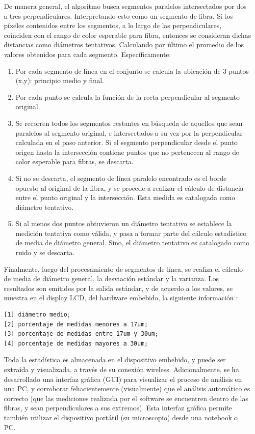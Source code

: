 \documentclass[runningheads,a4paper]{llncs}
\begin{document}
 
De manera general, el algoritmo busca segmentos paralelos intersectados por dos a tres perpendiculares.
Interpretando esto como un segmento de fibra. Si los píxeles contenidos entre los segmentos, a lo largo de
 las  perpendiculares, coinciden con el rango de color esperable para fibra, entonces se consideran dichas
distancias como diámetros tentativos. Calculando por último el promedio de los valores obtenidos para 
cada segmento. Específicamente:   


\begin{enumerate}
\item Por cada segmento de línea en el conjunto se calcula la ubicación de 3 puntos (x,y):
principio medio y final. 
\item Por cada punto se calcula la función de la recta perpendicular al segmento original.
\item Se recorren todos los segmentos restantes en búsqueda de aquellos que sean paralelos al segmento original, e intersectados a su vez por la perpendicular calculada en el paso anterior.
Si el segmento perpendicular desde el punto origen hasta la intersección contiene puntos que no pertenecen al rango de color esperable para fibras, se descarta.
\item Si no se descarta,  el segmento de línea paralelo encontrado es el borde opuesto al original de la fibra, y se procede a realizar el cálculo de distancia entre el punto original y la intersección. Esta medida es catalogada como diámetro tentativo.
\item Si al menos dos puntos obtuvieron un diámetro tentativo se establece la medición tentativa como válida, y pasa a formar parte del cálculo estadístico de media de diámetro general. Sino, el diámetro tentativo es catalogado como ruido y se descarta.
\end{enumerate}

	Finalmente, luego del procesamiento de segmentos de línea, se realiza el cálculo de media de diámetro general, la desviación estándar y la varianza.
	Los resultados son emitidos por la salida estándar, y de acuerdo a los valores, se muestra en el display LCD, del hardware embebido, la siguiente información :
\begin{Verbatim}
[1] diámetro medio;
[2] porcentaje de medidas menores a 17um;
[3] porcentaje de medidas entre 17um y 30um;
[4] porcentaje de medidas mayores a 30um;
\end{Verbatim}

Toda la estadística es almacenada en el dispositivo embebido, y puede ser extraída y visualizada, a través de su conexión wireless. Adicionalmente, se ha desarrollado una interfaz gráfica (GUI) para visualizar el proceso de análisis en una PC, y corroborar fehacientemente (visualmente) que el análisis automático es correcto (que las mediciones realizada por el software se encuentren dentro de las fibras, y sean perpendiculares a sus extremos). Esta interfaz gráfica permite también utilizar el dispositivo portátil (su microscopio) desde una notebook o PC. 
\end{document}

